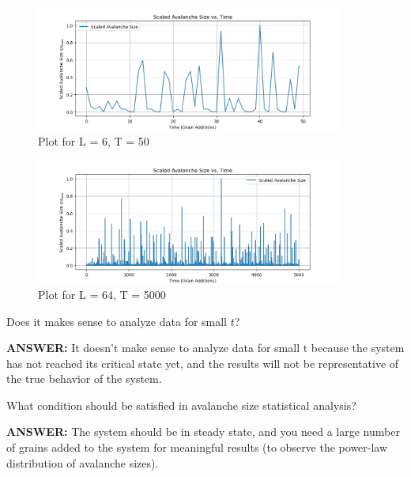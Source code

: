 \documentclass[10pt,letterpaper, onecolumn]{report}
\begin{document}
\begin{flushleft}
\begin{enumerate}
            \begin{figure}[htbp!]
                \centering
                \includegraphics[width=0.9\textwidth]{../avalanche_small.png}
                \caption{Plot for L = 6, T = 50}
            \end{figure}

            \begin{figure}[htbp!]
                \centering
                \includegraphics[width=0.9\textwidth]{../avalanche_big.png}
                \caption{Plot for L = 64, T = 5000}
            \end{figure}

            \clearpage

            Does it makes sense to analyze data for small $t$?
            \hfill\break

            \hspace{1.5em}\textbf{ANSWER:} It doesn’t make sense to analyze data for small t because the system has not reached its critical state yet, and the results will not be representative of the true behavior of the system.
            \hfill\break

            What condition should be satisfied in avalanche size statistical analysis?
            \hfill\break

            \hspace{1.5em}\textbf{ANSWER:} The system should be in steady state, and you need a large number of grains added to the system for meaningful results (to observe the power-law distribution of avalanche sizes).


\end{enumerate}
\end{flushleft}
\end{document}
